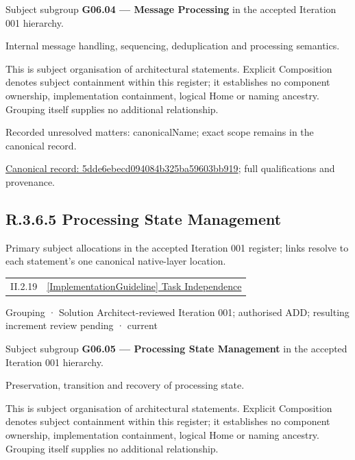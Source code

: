 Subject subgroup \textbf{G06.04 — Message Processing} in the accepted Iteration 001 hierarchy.



Internal message handling, sequencing, deduplication and processing semantics.



This is subject organisation of architectural statements. Explicit Composition denotes subject containment within this register; it establishes no component ownership, implementation containment, logical Home or naming ancestry. Grouping itself supplies no additional relationship.


{\small Recorded unresolved matters: canonicalName; exact scope remains in the canonical record.}\par
{\footnotesize \href{../../../../continuum/grouping/5dde6ebecd094084b325ba59603bb919.md}{Canonical record: 5dde6ebecd094084b325ba59603bb919}; full qualifications and provenance.}\par
\subsection*{R.3.6.5 Processing State Management}
\label{navigation:R.3.6.5}

Primary subject allocations in the accepted Iteration 001 register; links resolve to each statement’s one canonical native-layer location.\par
\begin{longtable}{p{.22\linewidth}p{.73\linewidth}}
II.2.19 & \hyperref[element:80fe052799944843917044749288f297]{[ImplementationGuideline] Task Independence} \\
\end{longtable}
\label{element:5e8ddc78f9554243aeb051f77595cc88}
{\small Grouping · Solution Architect-reviewed Iteration 001; authorised ADD; resulting increment review pending · current}\par

Subject subgroup \textbf{G06.05 — Processing State Management} in the accepted Iteration 001 hierarchy.



Preservation, transition and recovery of processing state.



This is subject organisation of architectural statements. Explicit Composition denotes subject containment within this register; it establishes no component ownership, implementation containment, logical Home or naming ancestry. Grouping itself supplies no additional relationship.


